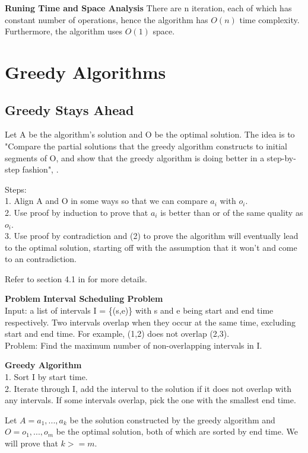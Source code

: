 \documentclass[12pt,article]{article}
\newenvironment{problem}[2][Problem]
    { \begin{mdframed}[backgroundcolor=gray!20] \textbf{#1 #2} \\}
    {  \end{mdframed}}
\begin{document}
\textbf{Runing Time and Space Analysis}
There are n iteration, each of which has constant number of operations, hence the algorithm has $O(n)$ time complexity. Furthermore, the algorithm uses $O(1)$ space.

\newpage
\section{Greedy Algorithms}
\subsection{Greedy Stays Ahead}
Let A be the algorithm's solution and O be the optimal solution. The idea is to "Compare the partial solutions that the greedy algorithm constructs to initial segments of O, and show that the greedy algorithm is doing better in a step-by-step fashion", \cite{kleinbergalgorithm}.

Steps: \\
1. Align A and O in some ways so that we can compare $a_i$ with $o_i$. \\
2. Use proof by induction to prove that $a_i$ is better than or of the same quality as $o_i$. \\
3. Use proof by contradiction and (2) to prove the algorithm will eventually lead to the optimal solution, starting off with the assumption that it won't and come to an contradiction.

Refer to section 4.1 in \cite{kleinbergalgorithm} for more details.

\begin{problem}{Interval Scheduling Problem} 
Input: a list of intervals I = \{(s,e)\} with s and e being start and end time respectively. Two intervals overlap when they occur at the same time, excluding start and end time. For example, (1,2) does not overlap (2,3). \\

Problem: Find the maximum number of non-overlapping intervals in I.
\end{problem}

\textbf{Greedy Algorithm}\\
1. Sort I by start time.\\
2. Iterate through I, add the interval to the solution if it does not overlap with any intervals. If some intervals overlap, pick the one with the smallest end time.

Let $A = a_1, ..., a_k$ be the solution constructed by the greedy algorithm and $O = o_1, ..., o_m$ be the optimal solution, both of which are sorted by end time. We will prove that $k >= m$.
\end{document}
